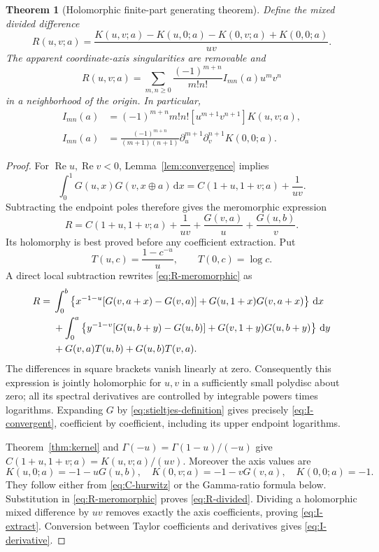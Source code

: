 \documentclass[11pt]{article}
\numberwithin{equation}{section}
\newtheorem{theorem}{Theorem}[section]
\theoremstyle{definition}
\theoremstyle{remark}
\DeclareMathOperator{\Rea}{Re}
\newcommand{\dd}{\,\mathrm d}
\newcommand{\coeff}[1]{\left[#1\right]}
\begin{document}
\begin{theorem}[Holomorphic finite-part generating theorem]
\label{thm:generating}
Define the mixed divided difference
\begin{equation}
 R(u,v;a)=\frac{K(u,v;a)-K(u,0;a)-K(0,v;a)+K(0,0;a)}{uv}.
 \label{eq:R-divided}
\end{equation}
The apparent coordinate-axis singularities are removable and
\begin{equation}
 R(u,v;a)=\sum_{m,n\ge0}
       \frac{(-1)^{m+n}}{m!n!}I_{mn}(a)u^mv^n
 \label{eq:R-series}
\end{equation}
in a neighborhood of the origin. In particular,
\begin{align}
 I_{mn}(a)&=(-1)^{m+n}m!n!\coeff{u^{m+1}v^{n+1}}K(u,v;a),
 \label{eq:I-extract}\\
 I_{mn}(a)&=\frac{(-1)^{m+n}}{(m+1)(n+1)}
   \partial_u^{m+1}\partial_v^{n+1}K(0,0;a).
 \label{eq:I-derivative}
\end{align}
\end{theorem}
\begin{proof}
For $\Rea u,\Rea v<0$, Lemma~\ref{lem:convergence} implies
\[
 \int_0^1G(u,x)G(v,x\mathbin\oplus a)\dd x
 =C(1+u,1+v;a)+\frac1{uv}.
\]
Subtracting the endpoint poles therefore gives the meromorphic expression
\begin{equation}
 R=C(1+u,1+v;a)+\frac1{uv}
       +\frac{G(v,a)}u+\frac{G(u,b)}v.
 \label{eq:R-meromorphic}
\end{equation}
Its holomorphy is best proved before any coefficient extraction. Put
\[
 T(u,c)=\frac{1-c^{-u}}u,\qquad T(0,c)=\log c.
\]
A direct local subtraction rewrites \eqref{eq:R-meromorphic} as
\begin{align}
 R={}&\int_0^b\left\{x^{-1-u}[G(v,a+x)-G(v,a)]
                    +G(u,1+x)G(v,a+x)\right\}\dd x\notag\\
 &+\int_0^a\left\{y^{-1-v}[G(u,b+y)-G(u,b)]
                    +G(v,1+y)G(u,b+y)\right\}\dd y\notag\\
 &+G(v,a)T(u,b)+G(u,b)T(v,a).
 \label{eq:R-subtracted}
\end{align}
The differences in square brackets vanish linearly at zero. Consequently
this expression is jointly holomorphic for $u,v$ in a sufficiently small
polydisc about zero; all its spectral derivatives are controlled by
integrable powers times logarithms. Expanding $G$ by
\eqref{eq:stieltjes-definition} gives precisely
\eqref{eq:I-convergent}, coefficient by coefficient, including its upper
endpoint logarithms.

Theorem~\ref{thm:kernel} and $\Gamma(-u)=\Gamma(1-u)/(-u)$ give
$C(1+u,1+v;a)=K(u,v;a)/(uv)$. Moreover the axis values are
\begin{equation}
 K(u,0;a)=-1-uG(u,b),\quad
 K(0,v;a)=-1-vG(v,a),\quad K(0,0;a)=-1.
 \label{eq:K-axes}
\end{equation}
They follow either from \eqref{eq:C-hurwitz} or the Gamma-ratio formula
below. Substitution in \eqref{eq:R-meromorphic} proves
\eqref{eq:R-divided}. Dividing a holomorphic mixed difference by $uv$
removes exactly the axis coefficients, proving \eqref{eq:I-extract}.
Conversion between Taylor coefficients and derivatives gives
\eqref{eq:I-derivative}.
\end{proof}
\end{document}
